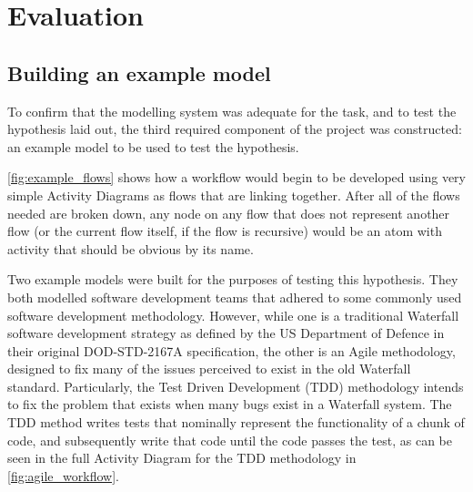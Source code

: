 
\chapter{Evaluation}
\label{evaluation}

\section{Building an example model}
To confirm that the modelling system was adequate for the task, and to test the hypothesis laid out, the third required component of the project was constructed: an example model to be used to test the hypothesis. \par

\cref{fig:example_flows} shows how a workflow would begin to be developed using very simple Activity Diagrams as flows that are linking together. After all of the flows needed are broken down, any node on any flow that does not represent another flow (or the current flow itself, if the flow is recursive) would be an atom with activity that should be obvious by its name. \par

Two example models were built for the purposes of testing this hypothesis. They both modelled software development teams that adhered to some commonly used software development methodology. However, while one is a traditional Waterfall software development strategy as defined by the US Department of Defence in their original DOD-STD-2167A specification\cite{DEPARTAMENTOFDEFENSE1984}, the other is an Agile methodology, designed to fix many of the issues perceived to exist in the old Waterfall standard. Particularly, the Test Driven Development (TDD) methodology intends to fix the problem that exists when many bugs exist in a Waterfall system. The TDD method writes tests that nominally represent the functionality of a chunk of code, and subsequently write that code until the code passes the test, as can be seen in the full Activity Diagram for the TDD methodology in \cref{fig:agile_workflow}. \par

